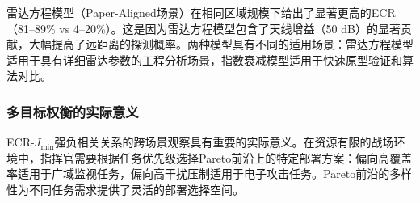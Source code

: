 雷达方程模型（Paper-Aligned场景）在相同区域规模下给出了显著更高的ECR（81--89\% vs 4--20\%）。这是因为雷达方程模型包含了天线增益（50 dB）的显著贡献，大幅提高了远距离的探测概率。两种模型具有不同的适用场景：雷达方程模型适用于具有详细雷达参数的工程分析场景，指数衰减模型适用于快速原型验证和算法对比。

\subsubsection{多目标权衡的实际意义}

ECR-$J_{\min}$强负相关关系的跨场景观察具有重要的实际意义。在资源有限的战场环境中，指挥官需要根据任务优先级选择Pareto前沿上的特定部署方案：偏向高覆盖率适用于广域监视任务，偏向高干扰压制适用于电子攻击任务。Pareto前沿的多样性为不同任务需求提供了灵活的部署选择空间。
